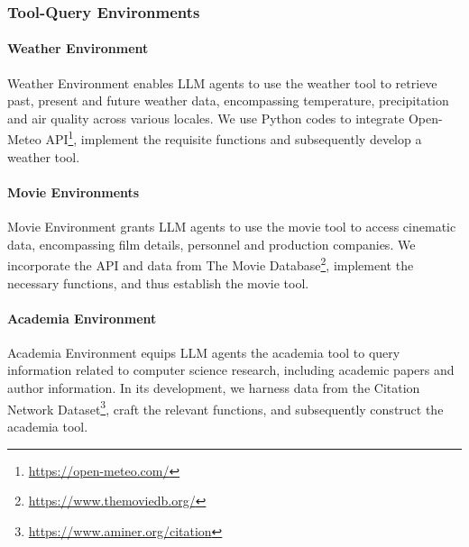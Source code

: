 







\subsubsection{Tool-Query Environments}
\label{appendix.a.2}
\paragraph{Weather Environment}
Weather Environment enables LLM agents to use the weather tool to retrieve past, present and future weather data, encompassing temperature, precipitation and air quality across various locales.
We use Python codes to integrate Open-Meteo API\footnote{\url{https://open-meteo.com/}}, implement the requisite functions and subsequently develop a weather tool.

\paragraph{Movie Environments}
Movie Environment grants LLM agents to use the movie tool to access cinematic data, encompassing film details, personnel and production companies.
We incorporate the API and data from The Movie Database\footnote{\url{https://www.themoviedb.org/}}, implement the necessary functions, and thus establish the movie tool.

\paragraph{Academia Environment}
Academia Environment equips LLM agents the academia tool to query information related to computer science research, including academic papers and author information.
In its development, we harness data from the Citation Network Dataset\footnote{\url{https://www.aminer.org/citation}}, craft the relevant functions, and subsequently construct the academia tool.

